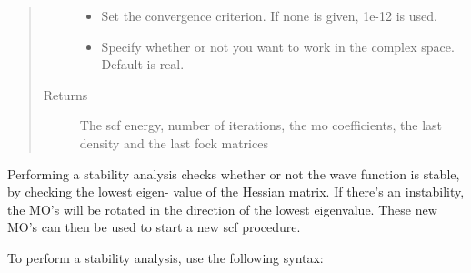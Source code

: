 \documentclass[letterpaper,10pt,english]{sphinxmanual}
\begin{document}
\begin{fulllineitems}
\begin{fulllineitems}
\begin{quote}
\begin{description}
\begin{itemize}
\item {} 
 \textendash{} Set the convergence criterion. If none is given, 1e-12 is used.

\item {} 
 \textendash{} Specify whether or not you want to work in the complex space. Default is real.

\end{itemize}

\item[{Returns}] \leavevmode
The scf energy, number of iterations, the mo coefficients, the last density and the last fock matrices

\end{description}\end{quote}

\end{fulllineitems}


\begin{fulllineitems}
\label{\detokenize{UHF:hf.HartreeFock.UHF.MF.stability}}
Performing a stability analysis checks whether or not the wave function is stable, by checking the lowest eigen-
value of the Hessian matrix. If there’s an instability, the MO’s will be rotated in the direction
of the lowest eigenvalue. These new MO’s can then be used to start a new scf procedure.

To perform a stability analysis, use the following syntax:


\end{fulllineitems}
\end{fulllineitems}
\end{document}

